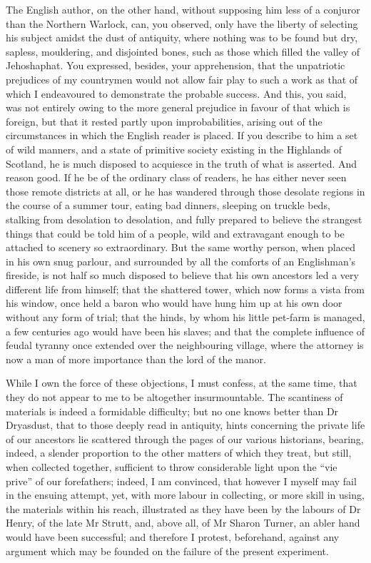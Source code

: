 The English author, on the other hand, without supposing him less of a
conjuror than the Northern Warlock, can, you observed, only have the
liberty of selecting his subject amidst the dust of antiquity, where
nothing was to be found but dry, sapless, mouldering, and disjointed
bones, such as those which filled the valley of Jehoshaphat. You
expressed, besides, your apprehension, that the unpatriotic prejudices
of my countrymen would not allow fair play to such a work as that of
which I endeavoured to demonstrate the probable success. And this, you
said, was not entirely owing to the more general prejudice in favour of
that which is foreign, but that it rested partly upon improbabilities,
arising out of the circumstances in which the English reader is placed.
If you describe to him a set of wild manners, and a state of primitive
society existing in the Highlands of Scotland, he is much disposed to
acquiesce in the truth of what is asserted. And reason good. If he be of
the ordinary class of readers, he has either never seen those remote
districts at all, or he has wandered through those desolate regions in
the course of a summer tour, eating bad dinners, sleeping on truckle
beds, stalking from desolation to desolation, and fully prepared to
believe the strangest things that could be told him of a people, wild
and extravagant enough to be attached to scenery so extraordinary. But
the same worthy person, when placed in his own snug parlour, and
surrounded by all the comforts of an Englishman's fireside, is not half
so much disposed to believe that his own ancestors led a very different
life from himself; that the shattered tower, which now forms a vista
from his window, once held a baron who would have hung him up at his own
door without any form of trial; that the hinds, by whom his little
pet-farm is managed, a few centuries ago would have been his slaves; and
that the complete influence of feudal tyranny once extended over the
neighbouring village, where the attorney is now a man of more importance
than the lord of the manor.

While I own the force of these objections, I must confess, at the same
time, that they do not appear to me to be altogether insurmountable. The
scantiness of materials is indeed a formidable difficulty; but no one
knows better than Dr Dryasdust, that to those deeply read in antiquity,
hints concerning the private life of our ancestors lie scattered through
the pages of our various historians, bearing, indeed, a slender
proportion to the other matters of which they treat, but still, when
collected together, sufficient to throw considerable light upon the
``vie prive'' of our forefathers; indeed, I am convinced, that however I
myself may fail in the ensuing attempt, yet, with more labour in
collecting, or more skill in using, the materials within his reach,
illustrated as they have been by the labours of Dr Henry, of the late Mr
Strutt, and, above all, of Mr Sharon Turner, an abler hand would have
been successful; and therefore I protest, beforehand, against any
argument which may be founded on the failure of the present experiment.

